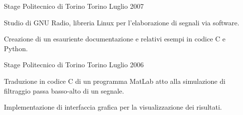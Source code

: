 \begin{cventries}
  \cventry
    {Stage} %
    {Politecnico di Torino} %
    {Torino} %
    {Luglio 2007} %
    {
      \begin{cvitems} %
        \item {Studio di GNU Radio, libreria Linux per l'elaborazione di segnali via software.}
        \item {Creazione di un esauriente documentazione e relativi esempi in codice C e Python.}
      \end{cvitems}
    }

  \cventry
    {Stage} %
    {Politecnico di Torino} %
    {Torino} %
    {Luglio 2006} %
    {
      \begin{cvitems} %
        \item {Traduzione in codice C di un programma MatLab atto alla simulazione di filtraggio passa basso-alto di un segnale.}
        \item {Implementazione di interfaccia grafica per la visualizzazione dei risultati.}
      \end{cvitems}
    }

\end{cventries}
